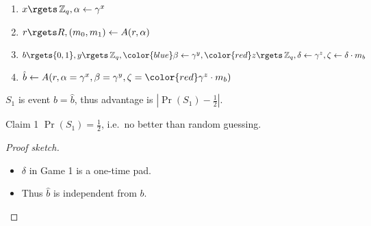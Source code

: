 \begin{frame}
  \begin{example}
    \begin{enumerate}
      \item \(x\rgets \Z_q, \alpha\gets\gamma^x\)
      \item \(r\rgets R, (m_0, m_1)\gets A(r, \alpha)\)
      \item \(b\rgets \{0,1\}, y\rgets \Z_q,
          {\color{blue} \beta\gets \gamma^y,
            {\color{red} z\rgets \Z_q, \delta\gets \gamma^z},
          \zeta\gets \delta\cdot m_b}\)
      \item \(\hat{b}\gets A(r,
          \alpha = \gamma^x, \beta = \gamma^y, \zeta = {\color{red} \gamma^z} 
          \cdot m_b)\)
    \end{enumerate}
    \(S_1\) is event \(b = \hat{b}\), thus advantage is \(|\Pr(S_1) 
      - \frac{1}{2}|\).
  \end{example}
\end{frame}

\begin{frame}
  \begin{block}{Claim 1}
    \(\Pr(S_1) = \frac{1}{2}\), i.e.\ no better than random guessing.
  \end{block}

  \begin{proof}[Proof sketch]
    \begin{itemize}
      \item \(\delta\) in Game 1 is a one-time pad.
      \item Thus \(\hat{b}\) is independent from \(b\).
    \end{itemize}
  \end{proof}
\end{frame}

